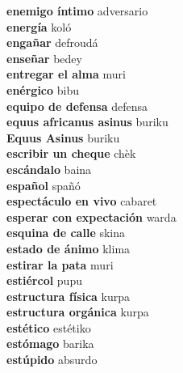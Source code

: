 \textbf{ enemigo íntimo  } adversario \\
\textbf{ energía  } koló \\
\textbf{ engañar  } defroudá \\
\textbf{ enseñar  } bedey \\
\textbf{ entregar el alma  } muri \\
\textbf{ enérgico  } bibu \\
\textbf{ equipo de defensa  } defensa \\
\textbf{ equus africanus asinus  } buriku \\
\textbf{ Equus Asinus  } buriku \\
\textbf{ escribir un cheque  } chèk \\
\textbf{ escándalo  } baina \\
\textbf{ español  } spañó \\
\textbf{ espectáculo en vivo  } cabaret \\
\textbf{ esperar con expectación  } warda \\
\textbf{ esquina de calle  } skina \\
\textbf{ estado de ánimo  } klima \\
\textbf{ estirar la pata  } muri \\
\textbf{ estiércol  } pupu \\
\textbf{ estructura física  } kurpa \\
\textbf{ estructura orgánica  } kurpa \\
\textbf{ estético  } estétiko \\
\textbf{ estómago  } barika \\
\textbf{ estúpido  } absurdo \\
